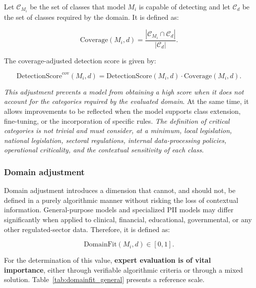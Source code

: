 \documentclass[11pt,a4paper]{article}
\begin{document}
Let $\mathcal{C}_{M_i}$ be the set of classes that model $M_i$ is capable of detecting and let $\mathcal{C}_d$ be the set of classes required by the domain. It is defined as:

\begin{equation}
    \mathrm{Coverage}(M_i,d)=
    \frac{|\mathcal{C}_{M_i}\cap \mathcal{C}_d|}{|\mathcal{C}_d|}.
\end{equation}

The coverage-adjusted detection score is given by:

\begin{equation}
    \mathrm{DetectionScore}^{\mathrm{cov}}(M_i,d)=
    \mathrm{DetectionScore}(M_i,d)\cdot \mathrm{Coverage}(M_i,d).
\end{equation}

\textit{This adjustment prevents a model from obtaining a high score when it does not account for the categories required by the evaluated domain}. At the same time, it allows improvements to be reflected when the model supports class extension, fine-tuning, or the incorporation of specific rules. \textit{The definition of critical categories is not trivial and must consider, at a minimum, local legislation, national legislation, sectoral regulations, internal data-processing policies, operational criticality, and the contextual sensitivity of each class}.

\subsubsection{Domain adjustment}

Domain adjustment introduces a dimension that cannot, and should not, be defined in a purely algorithmic manner without risking the loss of contextual information. General-purpose models and specialized PII models may differ significantly when applied to clinical, financial, educational, governmental, or any other regulated-sector data. Therefore, it is defined as:

\begin{equation}
    \mathrm{DomainFit}(M_i,d)\in[0,1].
\end{equation}

For the determination of this value, \textbf{expert evaluation is of vital importance}, either through verifiable algorithmic criteria or through a mixed solution. Table~\ref{tab:domainfit_general} presents a reference scale.
\end{document}
